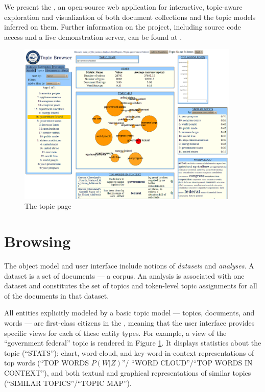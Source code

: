 \documentclass[11pt]{article}
\begin{document}
We present the \tool, an open-source web application for interactive,
topic-aware exploration and visualization of both document collections and the
topic models inferred on them. Further information on the project, including
source code access and a live demonstration server, can be found
at \texttt{\projecturl}.

\begin{figure}[t]
 \centering
 \includegraphics[width=400px,keepaspectratio=true]{./topic_page_take2.png}
 \caption{The topic page}
 \label{fig:topic_page}
\end{figure}


\section{Browsing}%
The \tool{} object model and user interface include notions of
\textit{datasets} and \textit{analyses}.
A dataset is a set of documents --- a corpus. An analysis is associated with one
dataset and constitutes the set of topics and token-level topic assignments for
all of the documents in that dataset.

All entities explicitly modeled by a basic topic model --- topics, documents, and
words --- are first-class citizens in the \tool, meaning that the user
interface provides specific views for each of these entity types. For example, a
view of the ``government federal'' topic is rendered in Figure \ref{fig:topic_page}.
It displays statistics about the topic (``STATS''); chart, word-cloud, and
key-word-in-context representations of top words (``TOP WORDS $P(W|Z)$''/
``WORD CLOUD''/``TOP WORDS IN CONTEXT''), and both textual and graphical
representations of similar topics (``SIMILAR TOPICS''/``TOPIC MAP'').
\end{document}
